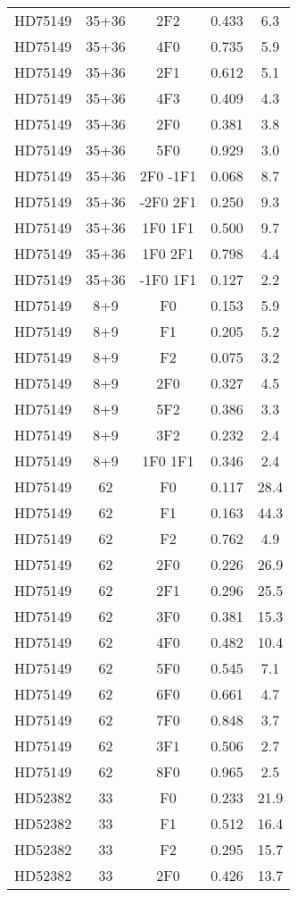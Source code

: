 \begin{table*}
\begin{tabular}{l c c c c}
HD75149 & 35+36 & 2F2 & 0.433 & 6.3\\ 
HD75149 & 35+36 & 4F0 & 0.735 & 5.9\\ 
HD75149 & 35+36 & 2F1 & 0.612 & 5.1\\ 
HD75149 & 35+36 & 4F3 & 0.409 & 4.3\\ 
HD75149 & 35+36 & 2F0 & 0.381 & 3.8\\ 
HD75149 & 35+36 & 5F0 & 0.929 & 3.0\\ 
HD75149 & 35+36 & 2F0 -1F1 & 0.068 & 8.7\\ 
HD75149 & 35+36 & -2F0 2F1 & 0.250 & 9.3\\ 
HD75149 & 35+36 & 1F0 1F1 & 0.500 & 9.7\\ 
HD75149 & 35+36 & 1F0 2F1 & 0.798 & 4.4\\ 
HD75149 & 35+36 & -1F0 1F1 & 0.127 & 2.2\\ 
\hline
HD75149 & 8+9 & F0 & 0.153 & 5.9\\ 
HD75149 & 8+9 & F1 & 0.205 & 5.2\\ 
HD75149 & 8+9 & F2 & 0.075 & 3.2\\ 
HD75149 & 8+9 & 2F0 & 0.327 & 4.5\\ 
HD75149 & 8+9 & 5F2 & 0.386 & 3.3\\ 
HD75149 & 8+9 & 3F2 & 0.232 & 2.4\\ 
HD75149 & 8+9 & 1F0 1F1 & 0.346 & 2.4\\ 
\hline
HD75149 & 62 & F0 & 0.117 & 28.4\\ 
HD75149 & 62 & F1 & 0.163 & 44.3\\ 
HD75149 & 62 & F2 & 0.762 & 4.9\\ 
HD75149 & 62 & 2F0 & 0.226 & 26.9\\ 
HD75149 & 62 & 2F1 & 0.296 & 25.5\\ 
HD75149 & 62 & 3F0 & 0.381 & 15.3\\ 
HD75149 & 62 & 4F0 & 0.482 & 10.4\\ 
HD75149 & 62 & 5F0 & 0.545 & 7.1\\ 
HD75149 & 62 & 6F0 & 0.661 & 4.7\\ 
HD75149 & 62 & 7F0 & 0.848 & 3.7\\ 
HD75149 & 62 & 3F1 & 0.506 & 2.7\\ 
HD75149 & 62 & 8F0 & 0.965 & 2.5\\ 
\hline
HD52382 & 33 & F0 & 0.233 & 21.9\\ 
HD52382 & 33 & F1 & 0.512 & 16.4\\ 
HD52382 & 33 & F2 & 0.295 & 15.7\\ 
HD52382 & 33 & 2F0 & 0.426 & 13.7\\ 

\end{tabular}
\end{table*}
